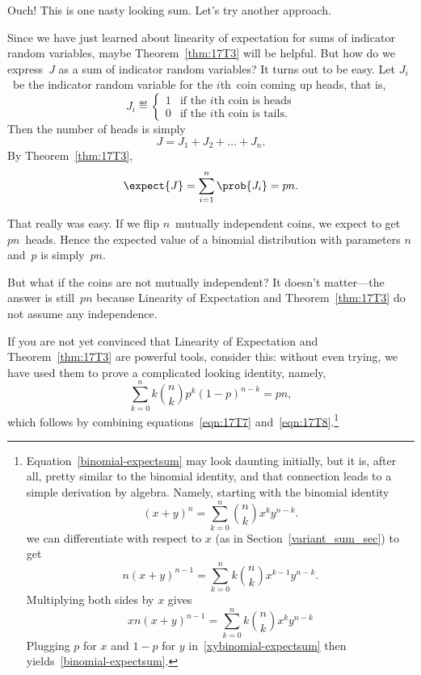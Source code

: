 \iffalse
\begin{align}
\expect{J}
    &= \sum_{k = 0}^n k \prob{J = k} \notag\\
    &= \sum_{k = 0}^n k \binom{n}{k} p^k (1 - p)^{n - k}. \label{eqn:17T7}
\end{align}
\fi

Ouch!  This is one nasty looking sum.  Let's try another approach.

Since we have just learned about linearity of expectation for sums of
indicator random variables, maybe Theorem~\ref{thm:17T3} will be
helpful.  But how do we express~$J$ as a sum of indicator random
variables?  It turns out to be easy.  Let $J_i$~be the indicator
random variable for the $i$th~coin coming up heads, that is,
\begin{equation*}
J_i \eqdef \begin{cases}
        1 & \text{if the $i$th coin is heads} \\
        0 & \text{if the $i$th coin is tails}.
      \end{cases}
\end{equation*}
Then the number of heads is simply
\begin{equation*}
    J = J_1 + J_2 + \dots + J_n.
\end{equation*}
By Theorem~\ref{thm:17T3},
\begin{equation}\label{eqn:17T8}
\expect{J} = \sum_{i = 1}^n \prob{J_i} = pn. 
\end{equation}

That really was easy.  If we flip $n$~mutually independent coins, we
expect to get $pn$~heads.  Hence the expected value of a binomial
distribution with parameters $n$ and~$p$ is simply~$pn$.

But what if the coins are not mutually independent?  It doesn't
matter---the answer is still~$p n$ because Linearity of Expectation
and Theorem~\ref{thm:17T3} do not assume any independence.

If you are not yet convinced that Linearity of Expectation and
Theorem~\ref{thm:17T3} are powerful tools, consider this: without even
trying, we have used them to prove a complicated looking identity,
namely,
\begin{equation}\label{binomial-expectsum}
    \sum_{k = 0}^n k \binom{n}{k} p^k (1 - p)^{n - k} = p n,
\end{equation}
which follows by combining equations~\eqref{eqn:17T7}
and~\eqref{eqn:17T8}.\footnote{Equation~\eqref{binomial-expectsum} may
  look daunting initially, but it is, after all, pretty similar to the
  binomial identity, and that connection leads to a simple derivation
  by algebra.  Namely, starting with the binomial identity
\[
(x + y)^n = \sum_{k = 0}^n \binom{n}{k} x^k y^{n - k}.
\]
we can differentiate with respect to $x$ (as in
Section~\ref{variant_sum_sec}) to get
\[
n(x + y)^{n-1} = \sum_{k = 0}^n k\binom{n}{k} x^{k-1} y^{n - k}.
\]
Multiplying both sides by $x$ gives
\begin{equation}\label{xybinomial-expectsum}
xn(x + y)^{n-1} = \sum_{k = 0}^n k\binom{n}{k} x^{k} y^{n - k}
\end{equation}
Plugging $p$ for $x$ and $1-p$ for $y$ in~\eqref{xybinomial-expectsum}
then yields~\eqref{binomial-expectsum}.}

